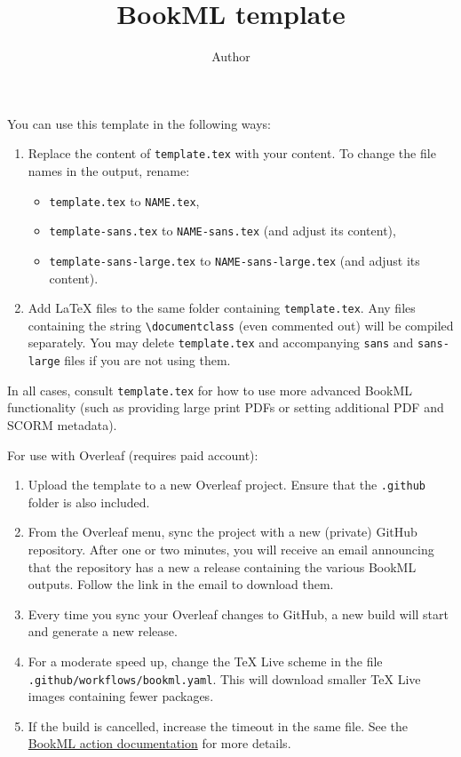 \documentclass[oneside,11pt]{amsart}
\title{BookML template}
\author{Author}
\begin{document}
\maketitle

You can use this template in the following ways:
\begin{enumerate}
  \item Replace the content of \texttt{template.tex} with your content. To change the file names in the output, rename:
  \begin{itemize}
      \item \texttt{template.tex} to \texttt{NAME.tex},
      \item \texttt{template-sans.tex} to \texttt{NAME-sans.tex} (and adjust its content),
      \item \texttt{template-sans-large.tex} to \texttt{NAME-sans-large.tex} (and adjust its content).
  \end{itemize}
  \item Add \LaTeX{} files to the same folder containing \texttt{template.tex}. Any files containing the string \verb|\documentclass| (even commented out) will be compiled separately. You may delete \texttt{template.tex} and accompanying \texttt{sans} and \texttt{sans-large} files if you are not using them.
\end{enumerate}
In all cases, consult \texttt{template.tex} for how to use more advanced BookML functionality (such as providing large print PDFs or setting additional PDF and SCORM metadata).

\bigskip

For use with Overleaf (requires paid account):
\begin{enumerate}
  \item Upload the template to a new Overleaf project. Ensure that the \texttt{.github} folder is also included.
  \item From the Overleaf menu, sync the project with a new (private) GitHub repository. After one or two minutes, you will receive an email announcing that the repository has a new a release containing the various BookML outputs. Follow the link in the email to download them.
  \item Every time you sync your Overleaf changes to GitHub, a new build will start and generate a new release.
  \item For a moderate speed up, change the \TeX{} Live scheme in the file \texttt{.github/workflows/bookml.yaml}. This will download smaller \TeX{} Live images containing fewer packages.
  \item If the build is cancelled, increase the timeout in the same file. See the \href{https://github.com/vlmantova/bookml-action}{BookML action documentation} for more details.
\end{enumerate}
\end{document}
